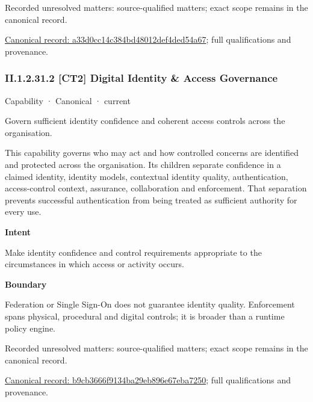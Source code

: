 {\small Recorded unresolved matters: source-qualified matters; exact scope remains in the canonical record.}\par
{\footnotesize \href{../../../../continuum/strategy/capability/a33d0cc14c384bd48012def4ded54a67.md}{Canonical record: a33d0cc14c384bd48012def4ded54a67}; full qualifications and provenance.}\par
\subsubsection*{II.1.2.31.2 [CT2] Digital Identity \& Access Governance}
\label{navigation:II.1.2.31.2}

\label{element:b9cb3666f9134ba29eb896e67eba7250}
{\small Capability · Canonical · current}\par

Govern sufficient identity confidence and coherent access controls across the organisation.



This capability governs who may act and how controlled concerns are identified and protected across the organisation. Its children separate confidence in a claimed identity, identity models, contextual identity quality, authentication, access-control context, assurance, collaboration and enforcement. That separation prevents successful authentication from being treated as sufficient authority for every use.



\textbf{Intent}



Make identity confidence and control requirements appropriate to the circumstances in which access or activity occurs.



\textbf{Boundary}



Federation or Single Sign-On does not guarantee identity quality. Enforcement spans physical, procedural and digital controls; it is broader than a runtime policy engine.


{\small Recorded unresolved matters: source-qualified matters; exact scope remains in the canonical record.}\par
{\footnotesize \href{../../../../continuum/strategy/capability/b9cb3666f9134ba29eb896e67eba7250.md}{Canonical record: b9cb3666f9134ba29eb896e67eba7250}; full qualifications and provenance.}\par
